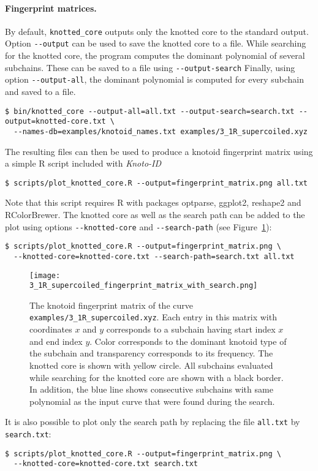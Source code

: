 \paragraph{Fingerprint matrices.}
By default, \lstinline{knotted_core} outputs only the knotted core to the standard output. Option \lstinline{--output} can be used to save the knotted core to a file.
While searching for the knotted core, the program computes the dominant polynomial of several subchains. These can be saved to a file using  \lstinline{--output-search}
Finally, using option \lstinline{--output-all}, the dominant polynomial is computed for every subchain and saved to a file. 
\begin{lstlisting}
$ bin/knotted_core --output-all=all.txt --output-search=search.txt --output=knotted-core.txt \
  --names-db=examples/knotoid_names.txt examples/3_1R_supercoiled.xyz
\end{lstlisting}
The resulting files can then be used to produce a knotoid fingerprint matrix\cite{yeates, sulkowska2012, gound} using a simple {\ttfamily R} script\cite{r2017} included with {\it Knoto-ID} 
\begin{lstlisting}
$ scripts/plot_knotted_core.R --output=fingerprint_matrix.png all.txt
\end{lstlisting}
Note that this script requires {\ttfamily R}\cite{r2017} with packages {\ttfamily optparse}\cite{optparse}, {\ttfamily ggplot2}\cite{wickham2009}, {\ttfamily reshape2}\cite{reshape2} and {\ttfamily RColorBrewer}\cite{rcolorbrewer}.
The knotted core as well as the search path can be added to the plot using options \lstinline{--knotted-core} and \lstinline{--search-path} (see Figure~\ref{fig:3_1R_supercoiled:fingerprint:search}):
\begin{lstlisting}
$ scripts/plot_knotted_core.R --output=fingerprint_matrix.png \
  --knotted-core=knotted-core.txt --search-path=search.txt all.txt
\end{lstlisting}
\begin{figure}[t]
\centering
\texttt{[image: 3\_1R\_supercoiled\_fingerprint\_matrix\_with\_search.png]}
\caption{ The knotoid fingerprint matrix of the curve \lstinline{examples/3_1R_supercoiled.xyz}. Each entry in this matrix with coordinates $x$ and $y$ corresponds to a subchain having start index $x$ and end index $y$. Color corresponds to the dominant knotoid type of the subchain and transparency corresponds to its frequency. The knotted core is shown with yellow circle. All subchains evaluated while searching for the knotted core are shown with a black border. In addition, the blue line shows consecutive subchains with same polynomial as the input curve that were found during the search.}\label{fig:3_1R_supercoiled:fingerprint:search}
\end{figure}
It is also possible to plot only the search path by replacing the file \lstinline{all.txt} by \lstinline{search.txt}:
\begin{lstlisting}
$ scripts/plot_knotted_core.R --output=fingerprint_matrix.png \
  --knotted-core=knotted-core.txt search.txt
\end{lstlisting}

